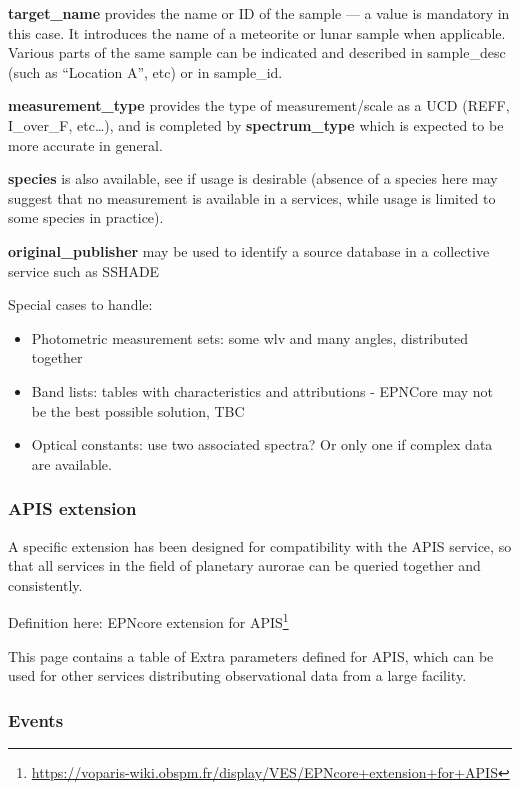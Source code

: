 \documentclass[11pt,a4paper]{ivoa}
\begin{document}
\textbf{target\_name }provides the name or ID of the sample — a value is mandatory in this case. It introduces the name of a meteorite or lunar sample when applicable. Various parts of the same sample can be indicated and described in sample\_desc (such as ``Location A'', etc) or in sample\_id.

\textbf{measurement\_type} provides the type of measurement/scale as a UCD (REFF, I\_over\_F, etc…), and is completed by \textbf{spectrum\_type} which is expected to be more accurate in general.

\textbf{species} is also available, see if usage is desirable (absence of a species here may suggest that no measurement is available in a services, while usage is limited to some species in practice).

\textbf{original\_publisher }may be used to identify a source database in a collective service such as SSHADE


Special cases to handle:

\begin{itemize}
\item Photometric measurement sets: some wlv and many angles, distributed together
\item Band lists: tables with characteristics and attributions - EPNCore may not be the best possible solution, TBC
\item Optical constants: use two associated spectra? Or only one if complex data are available.
\end{itemize}

\subsubsection{APIS extension}

A specific extension has been designed for compatibility with the APIS service, so that all services in the field of planetary aurorae can be queried together and consistently.

Definition here: EPNcore extension for APIS\footnote{\url{https://voparis-wiki.obspm.fr/display/VES/EPNcore+extension+for+APIS}}

This page contains a table of Extra parameters defined for APIS, which can be used for other services distributing observational data from a large facility.

\subsubsection{Events}
\end{document}
